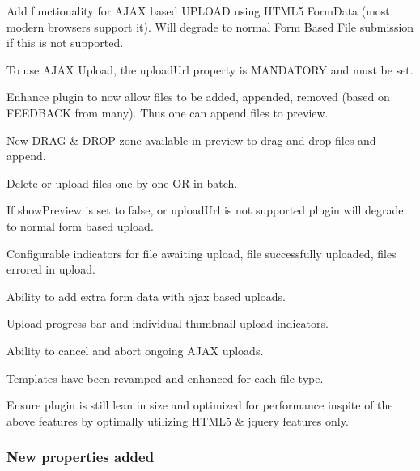 \begin{DoxyItemize}
\item Add functionality for A\+J\+AX based U\+P\+L\+O\+AD using H\+T\+M\+L5 Form\+Data (most modern browsers support it). Will degrade to normal Form Based File submission if this is not supported.
\item To use A\+J\+AX Upload, the {\ttfamily upload\+Url} property is M\+A\+N\+D\+A\+T\+O\+RY and must be set.
\item Enhance plugin to now allow files to be added, appended, removed (based on F\+E\+E\+D\+B\+A\+CK from many). Thus one can append files to preview.
\item New D\+R\+AG \& D\+R\+OP zone available in preview to drag and drop files and append.
\item Delete or upload files one by one OR in batch.
\item If {\ttfamily show\+Preview} is set to false, or upload\+Url is not supported plugin will degrade to normal form based upload.
\item Configurable indicators for file awaiting upload, file successfully uploaded, files errored in upload.
\item Ability to add extra form data with ajax based uploads.
\item Upload progress bar and individual thumbnail upload indicators.
\item Ability to cancel and abort ongoing A\+J\+AX uploads.
\item Templates have been revamped and enhanced for each file type.
\item Ensure plugin is still lean in size and optimized for performance inspite of the above features by optimally utilizing H\+T\+M\+L5 \& jquery features only.
\end{DoxyItemize}

\subsubsection*{New properties added}


